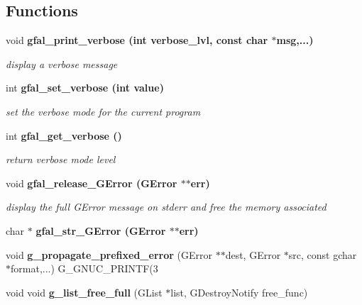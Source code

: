 \subsection*{Functions}
\begin{CompactItemize}
\item 
void \bf{gfal\_\-print\_\-verbose} (int verbose\_\-lvl, const char $\ast$msg,...)
\begin{CompactList}\small\item\em display a verbose message \item\end{CompactList}\item 
int \bf{gfal\_\-set\_\-verbose} (int value)
\begin{CompactList}\small\item\em set the verbose mode for the current program \item\end{CompactList}\item 
int \bf{gfal\_\-get\_\-verbose} ()\label{gfal__common__errverbose_8h_135b3fdd775aa7215e2ab4de1eea495f}

\begin{CompactList}\small\item\em return verbose mode level \item\end{CompactList}\item 
void \bf{gfal\_\-release\_\-GError} (GError $\ast$$\ast$err)\label{gfal__common__errverbose_8h_1441ea4b8176eb0cf3099009b950a3e9}

\begin{CompactList}\small\item\em display the full GError message on stderr and free the memory associated \item\end{CompactList}\item 
char $\ast$ \bf{gfal\_\-str\_\-GError} (GError $\ast$$\ast$err)
\item 
void \textbf{g\_\-propagate\_\-prefixed\_\-error} (GError $\ast$$\ast$dest, GError $\ast$src, const gchar $\ast$format,...) G\_\-GNUC\_\-PRINTF(3\label{gfal__common__errverbose_8h_f9695e2ac1722715b687c1818cb2993d}

\item 
void void \textbf{g\_\-list\_\-free\_\-full} (GList $\ast$list, GDestroy\-Notify free\_\-func)\label{gfal__common__errverbose_8h_5281973fe37b3ad6848d8a4d967cc762}

\end{CompactItemize}
